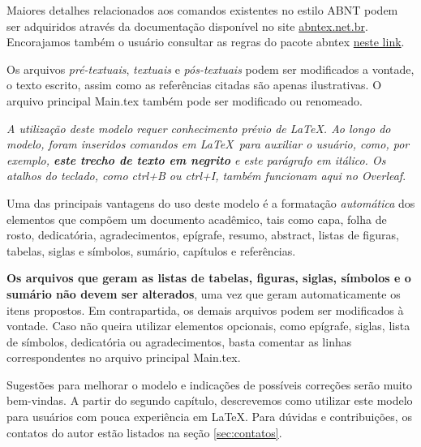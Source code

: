 Maiores detalhes relacionados aos comandos existentes no estilo ABNT podem ser adquiridos através da documentação disponível no site  \href{http://www.abntex.net.br/}{abntex.net.br}. Encorajamos também o usuário consultar as regras do pacote abntex \href{http://linorg.usp.br/CTAN/macros/latex/contrib/abntex2/doc/abntex2.pdf}{neste link}.

Os arquivos \textit{pré-textuais}, \textit{textuais} e \textit{pós-textuais} podem ser modificados a vontade, o texto escrito, assim como as referências citadas são apenas ilustrativas. O arquivo principal {\ttfamily Main.tex} também pode ser modificado ou renomeado.

\textit{A utilização deste modelo requer conhecimento prévio de \LaTeX. Ao longo do modelo, foram inseridos comandos em \LaTeX\ para auxiliar o usuário, como, por exemplo, \textbf{este trecho de texto em negrito} e este parágrafo em itálico. Os atalhos do teclado, como ctrl+B ou ctrl+I, também funcionam aqui no Overleaf}.

Uma das principais vantagens do uso deste modelo é a formatação \textit{automática} dos elementos que compõem um documento acadêmico, tais como capa, folha de rosto, dedicatória, agradecimentos, epígrafe, resumo, abstract, listas de figuras, tabelas, siglas e símbolos, sumário, capítulos e referências.

\textbf{Os arquivos que geram as listas de tabelas, figuras, siglas, símbolos e o sumário não devem ser alterados}, uma vez que geram automaticamente os itens propostos. Em contrapartida, os demais arquivos podem ser modificados à vontade. Caso não queira utilizar elementos opcionais, como epígrafe, siglas, lista de símbolos, dedicatória ou agradecimentos, basta comentar as linhas correspondentes no arquivo principal {\ttfamily Main.tex}.

Sugestões para melhorar o modelo e indicações de possíveis correções serão muito bem-vindas. A partir do segundo capítulo, descrevemos como utilizar este modelo para usuários com pouca experiência em \LaTeX.  Para dúvidas e contribuições, os contatos do autor estão listados na seção \ref{sec:contatos}.

